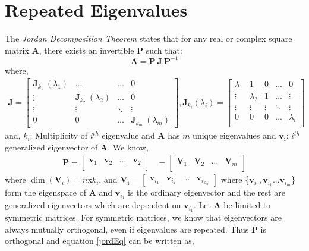 \section{Repeated Eigenvalues}
The \emph{Jordan Decomposition Theorem} states that for any real or complex square matrix $\mathbf{A}$, there exists an invertible $\mathbf{P}$ such that:
\begin{equation}
    \bm{A} = \bm{P}\: \bm{J}\: \bm{P}^{-1}
    \label{jordEq}
\end{equation}
where,
\begin{align*}
\bm{J}=
\begin{bmatrix}
\bm{J}_{k_1}\:(\lambda_1) & \dots & \dots & 0 \\
\vdots & \bm{J}_{k_2}\:(\lambda_2) & \dots & 0 \\
\vdots & \vdots & \ddots & \vdots \\
0 & 0 & \dots & \bm{J}_{k_m}\:(\lambda_m) 
\end{bmatrix},
 \bm{J}_{k_i}(\lambda_i) =
\begin{bmatrix}
    \lambda_1 & 1 & 0 & \dots & 0 \\
    \vdots & \lambda_2 & 1 & \dots & \vdots \\
    \vdots & \vdots & \vdots & \ddots & \vdots \\
    0 & 0 & 0 & \dots & \lambda_i \\
\end{bmatrix}
\end{align*}
and, $k_i$: Multiplicity of $i^{th}$ eigenvalue and $\mathbf{A}$ has $m$ unique eigenvalues and $\bm{v_i}$: $i^{th}$ generalized eigenvector of $\mathbf{A}$. We know,
\begin{align*}
\bm{P} =
\begin{bmatrix}
\bm{v}_1 & \bm{v}_2 & \dots & \bm{v}_2 \\ 
\end{bmatrix} 
&= 
\begin{bmatrix}
\bm{V}_1 & \bm{V}_2 & \dots & \bm{V}_m \\ 
\end{bmatrix}
\end{align*}
where $\dim(\bm{V}_i) = n $x$ k_i$, and
$\bm{V_i} = 
\begin{bmatrix}
\bm{v}_{i_1} & \bm{v}_{i_2} & \dots & \bm{v}_{i_{k_m}} 
\end{bmatrix}$
where \{$\bm{v}_{i_1},\bm{v}_{i_1} ... \bm{v}_{i_m}$\} form the eigenspace of $\mathbf{A}$ and $\bm{v}_{i_1}$ is the ordinary eigenvector and the rest are generalized eigenvectors which are dependent on $\bm{v}_{i_1}$. Let $\mathbf{A}$ be limited to symmetric matrices. For symmetric matrices, we know that eigenvectors are always mutually orthogonal, even if eigenvalues are repeated. Thus $\mathbf{P}$ is orthogonal and equation \ref{jordEq} can be written as,
